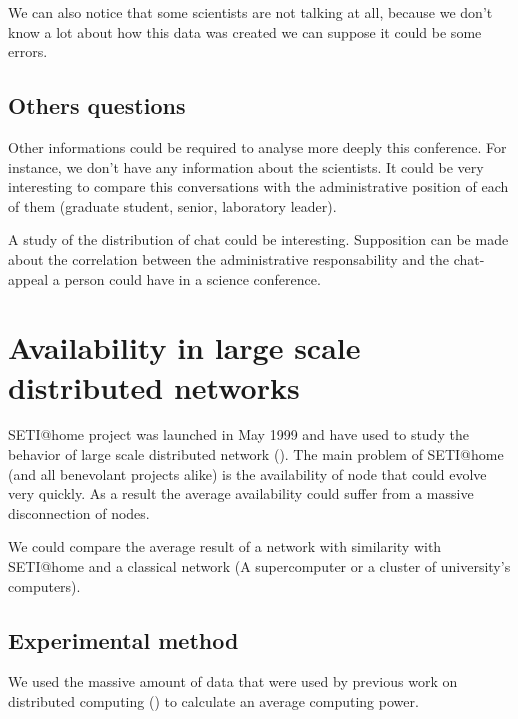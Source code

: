 \documentclass{sig-alternate-10pt}
\begin{document}
We can also notice that some scientists are not talking at all, because we don't know 
a lot about how this data was created we can suppose it could be some errors.

\subsection{Others questions}

Other informations could be required to analyse more deeply this conference. For instance, we don't 
have any information about the scientists. It could be very interesting to compare this conversations
with the administrative position of each of them (graduate student, senior, laboratory leader).

A study of the distribution of chat could be interesting. Supposition can be made about the correlation
between the administrative responsability and the chat-appeal a person could have in a science conference.


\section{Availability in large scale distributed networks}

SETI@home project was launched in May 1999 and have used to study the behavior of 
large scale distributed network (\cite{ja_ko_mascots09}). The main problem of SETI@home
(and all benevolant projects alike) is the availability of node that could evolve very quickly.
As a result the average availability could suffer from a massive disconnection of nodes.

We could compare the average result of a network with similarity with SETI@home and a classical
network (A supercomputer or a cluster of university's computers).

\subsection{Experimental method}

We used the massive amount of data that were used by previous work on distributed computing (\cite{ja_ko_mascots09})
to calculate an average computing power. 


\end{document}
